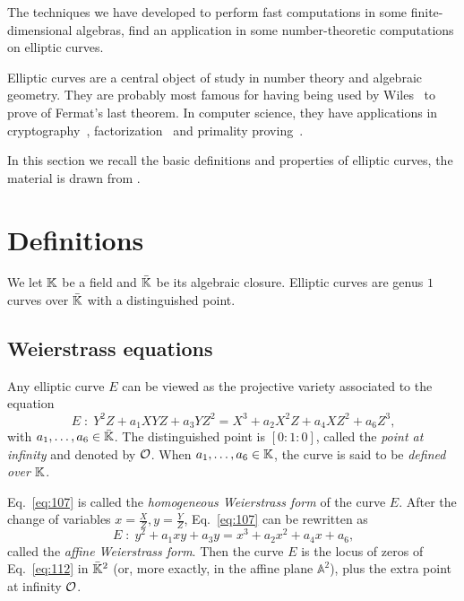 The techniques we have developed to perform fast computations in some
finite-dimensional algebras, find an application in some
number-theoretic computations on elliptic curves.

Elliptic curves are a central object of study in number theory and
algebraic geometry. They are probably most famous for having being
used by Wiles~\cite{wiles95,wiles+taylor95} to prove of Fermat's last
theorem. In computer science, they have applications in
cryptography~\cite{koblitz87,miller86,blake+seroussi+smart},
factorization~\cite{lenstra87,atkin+morain93,bernstein+birkner+lange+peters08-2}
and primality proving~\cite{atkin+morain93:2,morain07}.

In this section we recall the basic definitions and properties of
elliptic curves, the material is drawn from
\cite{silverman:elliptic,milne1996elliptic,connell:elliptic}.


\section{Definitions}
\label{sec:definitions}

We let $\mathbb{K}$ be a field and $\bar{\mathbb{K}}$ be its algebraic
closure. Elliptic curves are genus $1$ curves
over $\bar{\mathbb{K}}$ with a distinguished point.

\subsection{Weierstrass equations}
\label{sec:weierstr-equat}

\begin{definition}
   Any elliptic curve $E$ can be viewed as
  the projective variety associated to the equation
  \begin{equation}
    \label{eq:107}
    E\;:\; Y^2Z + a_1XYZ + a_3YZ^2 = X^3 + a_2X^2Z + a_4XZ^2 + a_6Z^3
    \text{,}
  \end{equation}
  with $a_1,\ldots,a_6\in\bar{\mathbb{K}}$.  The distinguished point is
  $[0:1:0]$, called the \emph{point at
    infinity} and denoted by $\mathcal{O}$.  When $a_1,\ldots,a_6\in\mathbb{K}$, the
  curve is said to be \emph{defined over $\mathbb{K}$}.
\end{definition}

Eq.~\eqref{eq:107} is called the \emph{homogeneous Weierstrass
  form} of the curve $E$.  After
the change of variables $x=\frac{X}{Z},y=\frac{Y}{Z}$,
Eq.~\eqref{eq:107} can be rewritten as
\begin{equation}
  \label{eq:112}
  E\;:\;y^2 + a_1xy + a_3y = x^3 + a_2x^2 + a_4x + a_6
  \text{,}
\end{equation}
called the \emph{affine Weierstrass
  form}. Then the curve $E$ is the
locus of zeros of Eq.~\eqref{eq:112} in $\bar{\mathbb{K}}^2$ (or, more
exactly, in the affine plane $\mathbb{A}^2$), plus the extra point at
infinity $\mathcal{O}$.


